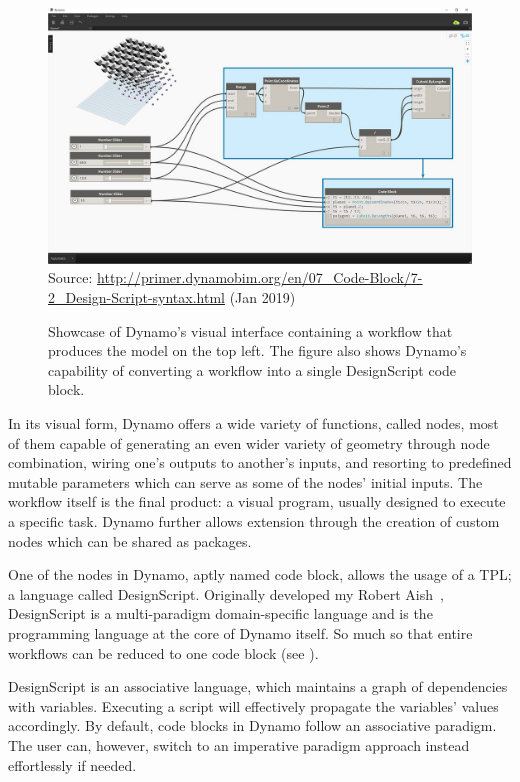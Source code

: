 \begin{figure}[htbp]
  \includegraphics[width=\textwidth]{fig/dynamo-node-to-code}\\
  {\scriptsize
  Source: \url{http://primer.dynamobim.org/en/07_Code-Block/7-2_Design-Script-syntax.html}
  (Jan 2019)
  }
  \caption[Dynamo's visual interface with node to code translation]{
    Showcase of Dynamo's visual interface containing a workflow that produces
    the model on the top left.  The figure also shows Dynamo's capability of
    converting a workflow into a single DesignScript code block.}%
  \label{fig:related.ad.dynamo.node2code}
\end{figure}

In its visual form, Dynamo offers a wide variety of functions, called nodes,
most of them capable of generating an even wider variety of geometry through
node combination, wiring one's outputs to another's inputs, and resorting to
predefined mutable parameters which can serve as some of the nodes' initial
inputs.  The workflow itself is the final product: a visual program, usually
designed to execute a specific task.  Dynamo further allows extension through the
creation of custom nodes which can be shared as packages.

One of the nodes in Dynamo, aptly named code block, allows the usage of a
\ac{TPL}; a language called DesignScript.  Originally developed my Robert
Aish~\cite{Aish:2011:DesignScript}, DesignScript is a multi-paradigm
domain-specific language and is the programming language at the core of Dynamo
itself.  So much so that entire workflows can be reduced to one code block (see
).

DesignScript is an associative language, which maintains a graph of dependencies
with variables.  Executing a script will effectively propagate the variables'
values accordingly.  By default, code blocks in Dynamo follow an associative
paradigm.  The user can, however, switch to an imperative paradigm approach
instead effortlessly if needed.

